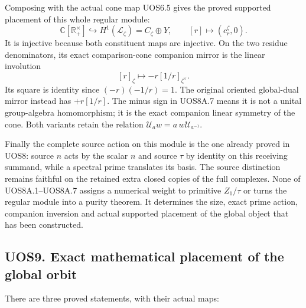 Composing with the actual cone map UOS6.5 gives the proved supported
placement of this whole regular module: \[
 \boxed{
 \mathbb C[\mathbb R_+^\times]\hookrightarrow
 H^1(\mathcal L_\zeta)=C_\zeta\oplus Y,
 \qquad [r]\longmapsto(c_r^\zeta,0).
 }
 \tag{UOS8A.6}
\] It is injective because both constituent maps are injective. On the
two residue denominators, its exact comparison-cone companion mirror is
the linear involution \[
 [r]_\zeta\longmapsto -r[1/r]_{\zeta^\vee}.
 \tag{UOS8A.7}
\] Its square is identity since \((-r)(-1/r)=1\). The original oriented
global-dual mirror instead has \(+r[1/r]\). The minus sign in UOS8A.7
means it is not a unital group-algebra homomorphism; it is the exact
companion linear symmetry of the cone. Both variants retain the relation
\(\mathcal U_a w=a\,w\mathcal U_{a^{-1}}\).

Finally the complete source action on this module is the one already
proved in UOS8: source \(n\) acts by the scalar \(n\) and source
\(\tau\) by identity on this receiving summand, while a spectral prime
translates its basis. The source distinction remains faithful on the
retained extra closed copies of the full complexes. None of
UOS8A.1--UOS8A.7 assigns a numerical weight to primitive \(Z_1/\tau\) or
turns the regular module into a purity theorem. It determines the size,
exact prime action, companion inversion and actual supported placement
of the global object that has been constructed.

\subsection{UOS9. Exact mathematical placement of the global
orbit}\label{uos9.-exact-mathematical-placement-of-the-global-orbit}

There are three proved statements, with their actual maps:

